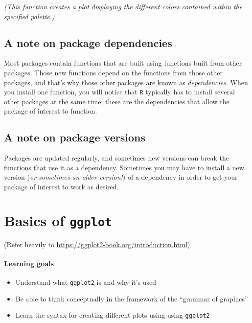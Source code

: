 \documentclass[
]{book}
\providecommand{\tightlist}{%
  \setlength{\itemsep}{0pt}\setlength{\parskip}{0pt}}
\begin{document}
\emph{(This function creates a plot displaying the different colors contained within the specified palette.)}

\hypertarget{a-note-on-package-dependencies}{%
\section*{A note on package dependencies}\label{a-note-on-package-dependencies}}

Most packages contain functions that are built using functions built from other packages. Those new functions depend on the functions from those other packages, and that's why those other packages are known as \emph{dependencies}. When you install one function, you will notice that \texttt{R} typically has to install several other packages at the same time; these are the dependencies that allow the package of interest to function.

\hypertarget{a-note-on-package-versions}{%
\section*{A note on package versions}\label{a-note-on-package-versions}}

Packages are updated regularly, and sometimes new versions can break the functions that use it as a dependency. Sometimes you may have to install a new version (\emph{or sometimes an older version!}) of a dependency in order to get your package of interest to work as desired.

\hypertarget{basics-of-ggplot}{%
\chapter{\texorpdfstring{Basics of \texttt{ggplot}}{Basics of ggplot}}\label{basics-of-ggplot}}

(Refer heavily to \url{https://ggplot2-book.org/introduction.html})

\hypertarget{learning-goals-7}{%
\subsubsection*{Learning goals}\label{learning-goals-7}}

\begin{itemize}
\tightlist
\item
  Understand what \texttt{ggplot2} is and why it's used
\item
  Be able to think conceptually in the framework of the ``grammar of graphics''
\item
  Learn the syntax for creating different plots using using \texttt{ggplot2}
\end{itemize}
\end{document}
